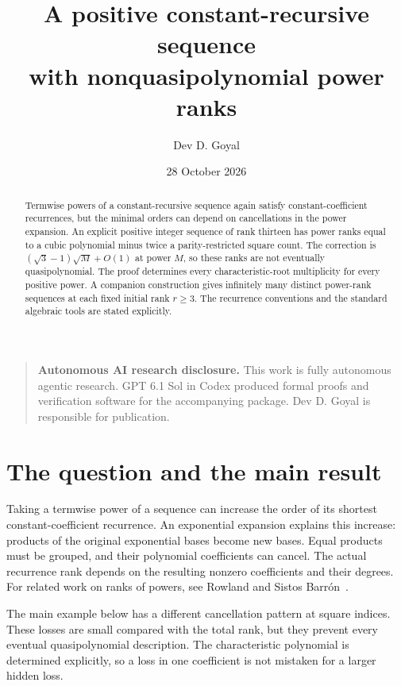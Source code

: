 \documentclass[11pt,a4paper]{article}
\title{A positive constant-recursive sequence\\with nonquasipolynomial power ranks}
\author{Dev D. Goyal}
\date{28 October 2026}
\begin{document}
\maketitle
\begin{quote}\small
\textbf{Autonomous AI research disclosure.}
This work is fully autonomous agentic research. GPT 6.1 Sol in Codex
produced formal proofs and verification software for the accompanying
package. Dev D. Goyal is responsible for publication.
\end{quote}
\begin{abstract}
Termwise powers of a constant-recursive sequence again satisfy constant-coefficient
recurrences, but the minimal orders can depend on cancellations in the power
expansion. An explicit positive integer sequence of rank thirteen has power ranks
equal to a cubic polynomial minus twice a parity-restricted square count.
The correction is $(\sqrt3-1)\sqrt M+O(1)$ at power $M$, so these ranks are
not eventually quasipolynomial. The proof determines every characteristic-root
multiplicity for every positive power. A companion construction gives infinitely
many distinct power-rank sequences at each fixed initial rank $r\ge3$.
The recurrence conventions and the standard algebraic tools are stated explicitly.
\end{abstract}

\section{The question and the main result}
Taking a termwise power of a sequence can increase the order of its shortest
constant-coefficient recurrence. An exponential expansion explains this increase:
products of the original exponential bases become new bases. Equal products
must be grouped, and their polynomial coefficients can cancel. The actual
recurrence rank depends on the resulting nonzero coefficients and their degrees.
For related work on ranks of powers, see Rowland and Sistos Barr\'on~\cite{RowlandSistos}.

The main example below has a different cancellation pattern at square indices.
These losses are small compared with the total rank, but they prevent every
eventual quasipolynomial description. The characteristic polynomial is determined
explicitly, so a loss in one coefficient is not mistaken for a larger hidden loss.
\end{document}
